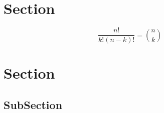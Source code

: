 \documentclass[a4paper]{article}
\begin{document}
\section{Section}

\[ \frac{n!}{k!(n-k)!} = \binom{n}{k} \]

\section{Section}

\subsection{SubSection}
\end{document}
